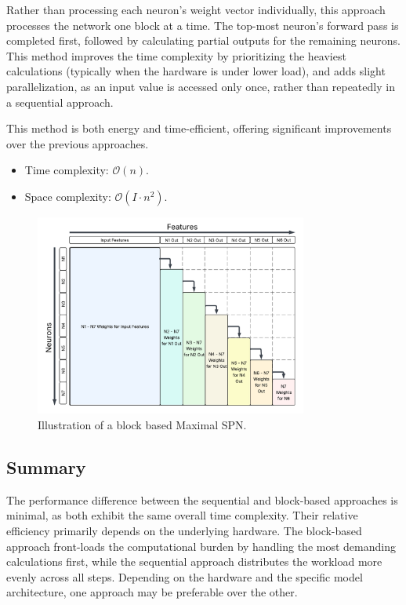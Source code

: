 Rather than processing each neuron’s weight vector individually, this approach processes the network one block at a time. The top-most neuron’s forward pass is completed first, followed by calculating partial outputs for the remaining neurons. This method improves the time complexity by prioritizing the heaviest calculations (typically when the hardware is under lower load), and adds slight parallelization, as an input value is accessed only once, rather than repeatedly in a sequential approach.

This method is both energy and time-efficient, offering significant improvements over the previous approaches.

\begin{itemize}
    \item Time complexity: $\mathcal{O}(n)$.
    \item Space complexity: $\mathcal{O}(I \cdot n^2)$.
\end{itemize}

\begin{figure}[h!]
\centering
\includegraphics[width=0.8\textwidth]{Figures/Methodology/Block_Based_Maximal_SPN_Weights.png}
\caption{Illustration of a block based Maximal SPN.}
\label{fig:blockMaxSpn}
\end{figure}

\subsection{Summary}

The performance difference between the sequential and block-based approaches is minimal, as both exhibit the same overall time complexity. Their relative efficiency primarily depends on the underlying hardware. The block-based approach front-loads the computational burden by handling the most demanding calculations first, while the sequential approach distributes the workload more evenly across all steps. Depending on the hardware and the specific model architecture, one approach may be preferable over the other.

